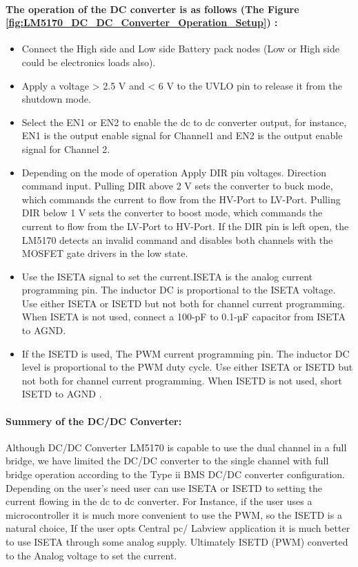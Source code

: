 \paragraph{The operation of the DC converter is as follows (The Figure \ref{fig:LM5170_DC_DC_Converter_Operation_Setup}) :}
\begin{itemize}
    \item Connect the High side and Low side Battery pack nodes (Low or High side could be electronics loads also).
    \item Apply a voltage > 2.5 V and < 6 V  to the UVLO pin to release it from the shutdown mode.
    \item Select the EN1 or EN2 to enable the dc to dc converter output, for instance, EN1 is the output enable signal for Channel1 and EN2 is the output enable signal for Channel 2.
    \item Depending on the mode of operation Apply DIR pin voltages. Direction command input. Pulling DIR above 2 V sets the converter to buck mode, which commands the current to flow from the HV-Port to LV-Port. Pulling DIR below 1 V sets the converter to boost mode, which commands the current to flow from the LV-Port to HV-Port. If the DIR pin is left open, the LM5170 detects an invalid command and disables both channels with the MOSFET gate drivers in the low state\cite[p .5]{TI_LM5170_EVM_User_Guide}. 
    \item Use the ISETA signal to set the current.ISETA is the analog current programming pin. The inductor DC is proportional to the ISETA voltage. Use either ISETA or ISETD but not both for channel current programming. When ISETA is not used, connect a 100-pF to 0.1-µF capacitor from ISETA to AGND\cite[p .5]{TI_LM5170_EVM_User_Guide}.
    \item If the ISETD is used, The PWM current programming pin. The inductor DC level is proportional to the PWM duty cycle. Use either ISETA or ISETD but not both for channel current programming. When ISETD is not used, short ISETD to AGND \cite[p .6]{TI_LM5170_EVM_User_Guide}.
\end{itemize}
\paragraph{Summery of the DC/DC Converter:}
\indent Although DC/DC Converter LM5170 is capable to use the dual channel in a full bridge, we have limited the DC/DC converter to the single channel with full bridge operation according to the Type ii BMS DC/DC converter configuration. Depending on the user's need user can use ISETA or ISETD to setting the current flowing in the dc to dc converter. For Instance, if the user uses a microcontroller it is much more convenient to use the PWM, so the ISETD is a natural choice, If the user opts Central pc/ Labview application it is much better to use ISETA through some analog supply. Ultimately ISETD (PWM) converted to the Analog voltage to set the current.